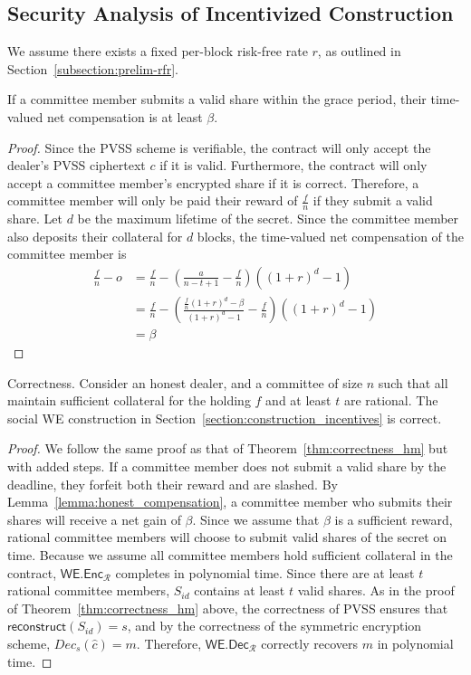 \subsection{Security Analysis of Incentivized Construction}
We assume there exists a fixed per-block risk-free rate $r$, as outlined in Section~\ref{subsection:prelim-rfr}.
\begin{lemma}\label{lemma:honest_compensation}
    If a committee member submits a valid share within the grace period, their time-valued net compensation is at least $\beta$.
\end{lemma}
\begin{proof}
    Since the PVSS scheme is verifiable, the contract will only accept the dealer's PVSS ciphertext $c$ if it is valid.
    Furthermore, the contract will only accept a committee member's encrypted share if it is correct.
    Therefore, a committee member will only be paid their reward of $\frac{f}{n}$ if they submit a valid share.
    Let $d$ be the maximum lifetime of the secret.
    Since the committee member also deposits their collateral for $d$ blocks, the time-valued net compensation of the committee member is
    \begin{align*}
        \frac{f}{n} - o &= \frac{f}{n} - (\frac{a}{n - t + 1} - \frac{f}{n})((1 + r)^d - 1) \\
        &= \frac{f}{n} - (\frac{\frac{f}{n}(1 + r)^d - \beta}{(1 + r)^d - 1} - \frac{f}{n})((1 + r)^d - 1) \\
        &= \beta
    \end{align*}
\end{proof}
\begin{theorem}{Correctness.}
    Consider an honest dealer, and a committee of size $n$ such that all maintain sufficient collateral for the holding $f$ and at least $t$ are rational.
    The social WE construction in Section~\ref{section:construction_incentives} is correct.
\end{theorem}
\begin{proof}
    We follow the same proof as that of Theorem~\ref{thm:correctness_hm} but with added steps.
    If a committee member does not submit a valid share by the deadline, they forfeit both their reward and are slashed.
    By Lemma~\ref{lemma:honest_compensation}, a committee member who submits their shares will receive a net gain of $\beta$.
    Since we assume that $\beta$ is a sufficient reward, rational committee members will choose to submit valid shares of the secret on time.
    Because we assume all committee members hold sufficient collateral in the contract, $\textsf{WE.Enc}_\mathcal{R}$ completes in polynomial time.
    Since there are at least $t$ rational committee members, $S_{id}$ contains at least $t$ valid shares.
    As in the proof of Theorem~\ref{thm:correctness_hm} above, the correctness of PVSS ensures that $\textsf{reconstruct}(S_{id}) = s$, and by the correctness of the symmetric encryption scheme, $Dec_s(\hat{c}) = m$.
    Therefore, $\textsf{WE.Dec}_\mathcal{R}$ correctly recovers $m$ in polynomial time.
\end{proof}
